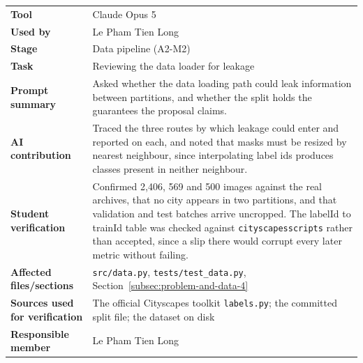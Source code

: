 \noindent\begin{minipage}{\textwidth}
\begin{tabularx}{\textwidth}{lX}
\hline
\textbf{Tool} & Claude Opus 5 \\
\textbf{Used by} & Le Pham Tien Long \\
\textbf{Stage} & Data pipeline (A2-M2) \\
\textbf{Task} & Reviewing the data loader for leakage \\
\textbf{Prompt summary} & Asked whether the data loading path could leak information between partitions, and whether the split holds the guarantees the proposal claims. \\
\textbf{AI contribution} & Traced the three routes by which leakage could enter and reported on each, and noted that masks must be resized by nearest neighbour, since interpolating label ids produces classes present in neither neighbour. \\
\textbf{Student verification} & Confirmed 2,406, 569 and 500 images against the real archives, that no city appears in two partitions, and that validation and test batches arrive uncropped. The labelId to trainId table was checked against \texttt{cityscapesscripts} rather than accepted, since a slip there would corrupt every later metric without failing. \\
\textbf{Affected files/sections} & \texttt{src/data.py}, \texttt{tests/test\_data.py}, Section~\ref{subsec:problem-and-data-4} \\
\textbf{Sources used for verification} & The official Cityscapes toolkit \texttt{labels.py}; the committed split file; the dataset on disk \\
\textbf{Responsible member} & Le Pham Tien Long \\
\hline
\end{tabularx}
\end{minipage}

